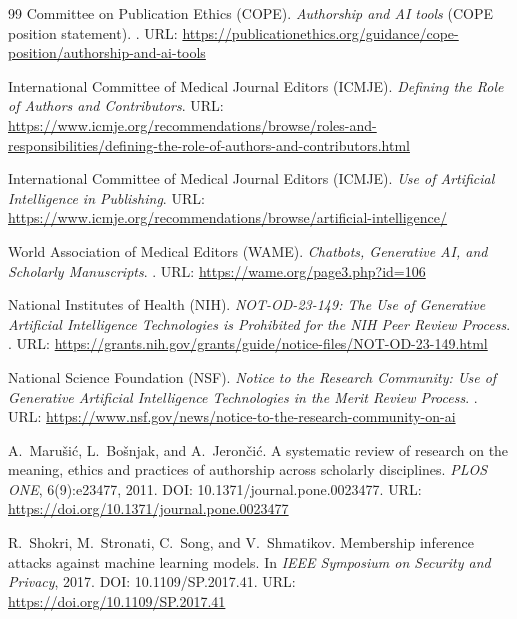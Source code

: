 \documentclass[11pt]{article}
\begin{document}
\begin{thebibliography}{99}
Committee on Publication Ethics (COPE).
\newblock \emph{Authorship and AI tools} (COPE position statement).
.
\newblock URL: \url{https://publicationethics.org/guidance/cope-position/authorship-and-ai-tools}

International Committee of Medical Journal Editors (ICMJE).
\newblock \emph{Defining the Role of Authors and Contributors}.
\newblock URL: \url{https://www.icmje.org/recommendations/browse/roles-and-responsibilities/defining-the-role-of-authors-and-contributors.html}

International Committee of Medical Journal Editors (ICMJE).
\newblock \emph{Use of Artificial Intelligence in Publishing}.
\newblock URL: \url{https://www.icmje.org/recommendations/browse/artificial-intelligence/}

World Association of Medical Editors (WAME).
\newblock \emph{Chatbots, Generative AI, and Scholarly Manuscripts}.
.
\newblock URL: \url{https://wame.org/page3.php?id=106}

National Institutes of Health (NIH).
\newblock \emph{NOT-OD-23-149: The Use of Generative Artificial Intelligence Technologies is Prohibited for the NIH Peer Review Process}.
.
\newblock URL: \url{https://grants.nih.gov/grants/guide/notice-files/NOT-OD-23-149.html}

National Science Foundation (NSF).
\newblock \emph{Notice to the Research Community: Use of Generative Artificial Intelligence Technologies in the Merit Review Process}.
.
\newblock URL: \url{https://www.nsf.gov/news/notice-to-the-research-community-on-ai}

A.~Maru\v{s}i\'c, L.~Bo\v{s}njak, and A.~Jeron\v{c}i\'c.
\newblock A systematic review of research on the meaning, ethics and practices of authorship across scholarly disciplines.
\newblock \emph{PLOS ONE}, 6(9):e23477, 2011.
\newblock DOI: 10.1371/journal.pone.0023477. URL: \url{https://doi.org/10.1371/journal.pone.0023477}

R.~Shokri, M.~Stronati, C.~Song, and V.~Shmatikov.
\newblock Membership inference attacks against machine learning models.
\newblock In \emph{IEEE Symposium on Security and Privacy}, 2017.
\newblock DOI: 10.1109/SP.2017.41. URL: \url{https://doi.org/10.1109/SP.2017.41}


\end{thebibliography}
\end{document}
